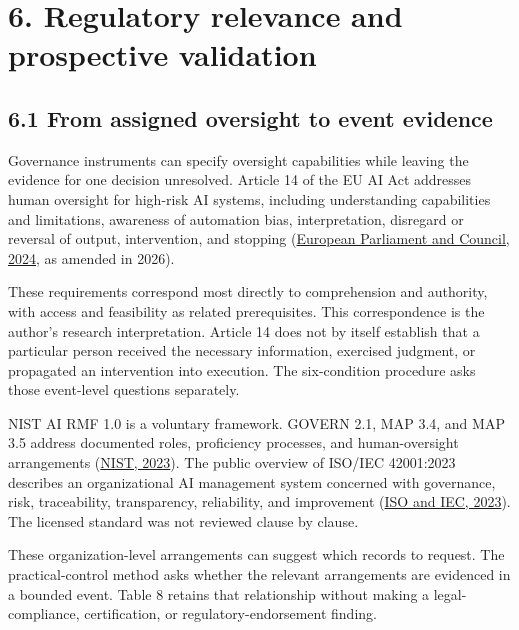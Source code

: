 \documentclass[11pt]{article}
\begin{document}
\section*{6. Regulatory relevance and prospective validation}

\subsection*{6.1 From assigned oversight to event evidence}

Governance instruments can specify oversight capabilities while leaving the evidence for one decision unresolved. Article 14 of the EU AI Act addresses human oversight for high-risk AI systems, including understanding capabilities and limitations, awareness of automation bias, interpretation, disregard or reversal of output, intervention, and stopping (\href{https://eur-lex.europa.eu/eli/reg/2024/1689/oj}{European Parliament and Council, 2024}, as amended in 2026).

These requirements correspond most directly to comprehension and authority, with access and feasibility as related prerequisites. This correspondence is the author’s research interpretation. Article 14 does not by itself establish that a particular person received the necessary information, exercised judgment, or propagated an intervention into execution. The six-condition procedure asks those event-level questions separately.

NIST AI RMF 1.0 is a voluntary framework. GOVERN 2.1, MAP 3.4, and MAP 3.5 address documented roles, proficiency processes, and human-oversight arrangements (\href{https://airc.nist.gov/airmf-resources/airmf/5-sec-core/}{NIST, 2023}). The public overview of ISO/IEC 42001:2023 describes an organizational AI management system concerned with governance, risk, traceability, transparency, reliability, and improvement (\href{https://www.iso.org/standard/42001}{ISO and IEC, 2023}). The licensed standard was not reviewed clause by clause.

These organization-level arrangements can suggest which records to request. The practical-control method asks whether the relevant arrangements are evidenced in a bounded event. Table 8 retains that relationship without making a legal-compliance, certification, or regulatory-endorsement finding.
\end{document}
